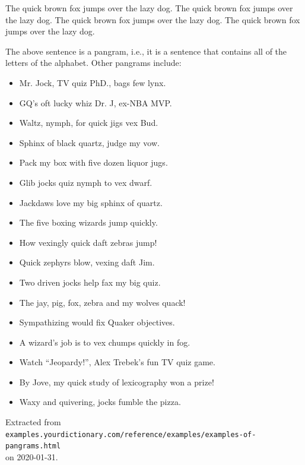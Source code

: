 The quick brown fox jumps over the lazy dog. 
The quick brown fox jumps over the lazy dog. 
The quick brown fox jumps over the lazy dog. 
The quick brown fox jumps over the lazy dog. 

The above sentence is a pangram, i.e., it is a sentence that contains all of the letters of the alphabet. Other pangrams include:
\begin{itemize}
	\item Mr. Jock, TV quiz PhD., bags few lynx.
	\item GQ's oft lucky whiz Dr. J, ex-NBA MVP.
	\item Waltz, nymph, for quick jigs vex Bud. 
	\item Sphinx of black quartz, judge my vow.
	\item Pack my box with five dozen liquor jugs. 
	\item Glib jocks quiz nymph to vex dwarf.
	\item Jackdaws love my big sphinx of quartz.
	\item The five boxing wizards jump quickly.
	\item How vexingly quick daft zebras jump!
	\item Quick zephyrs blow, vexing daft Jim.
	\item Two driven jocks help fax my big quiz.
	\item The jay, pig, fox, zebra and my wolves quack!
	\item Sympathizing would fix Quaker objectives.
	\item A wizard's job is to vex chumps quickly in fog.
	\item Watch ``Jeopardy!'', Alex Trebek's fun TV quiz game.
	\item By Jove, my quick study of lexicography won a prize!
	\item Waxy and quivering, jocks fumble the pizza.
\end{itemize}

Extracted from \\
\verb!examples.yourdictionary.com/reference/examples/examples-of-pangrams.html! \\
on 2020-01-31.